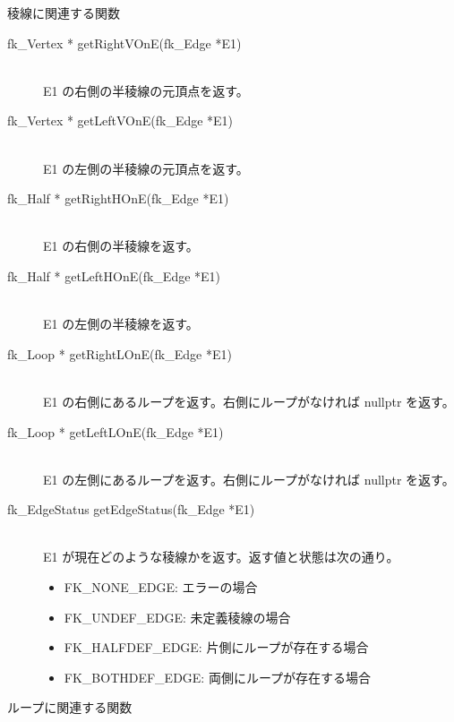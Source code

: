 \begin{center}
{\large 稜線に関連する関数}
\end{center}
\begin{description}
 \item[\hspace*{0.6cm}fk\_Vertex * getRightVOnE(fk\_Edge *E1)] ~ \\
	E1 の右側の半稜線の元頂点を返す。

 \item[\hspace*{0.6cm}fk\_Vertex * getLeftVOnE(fk\_Edge *E1)] ~ \\
	E1 の左側の半稜線の元頂点を返す。

 \item[\hspace*{0.6cm}fk\_Half * getRightHOnE(fk\_Edge *E1)] ~ \\
	E1 の右側の半稜線を返す。

 \item[\hspace*{0.6cm}fk\_Half * getLeftHOnE(fk\_Edge *E1)] ~ \\
	E1 の左側の半稜線を返す。

 \item[\hspace*{0.6cm}fk\_Loop * getRightLOnE(fk\_Edge *E1)] ~ \\
	E1 の右側にあるループを返す。右側にループがなければ
	nullptr を返す。

 \item[\hspace*{0.6cm}fk\_Loop * getLeftLOnE(fk\_Edge *E1)] ~ \\
	E1 の左側にあるループを返す。右側にループがなければ
	nullptr を返す。

 \item[\hspace*{0.6cm}fk\_EdgeStatus getEdgeStatus(fk\_Edge *E1)] ~ \\
	E1 が現在どのような稜線かを返す。返す値と状態は次の通り。
	\begin{itemize}
	 \item FK\_NONE\_EDGE: エラーの場合
	 \item FK\_UNDEF\_EDGE: 未定義稜線の場合
	 \item FK\_HALFDEF\_EDGE: 片側にループが存在する場合
	 \item FK\_BOTHDEF\_EDGE: 両側にループが存在する場合
	\end{itemize}
\end{description}
\begin{center}
{\large ループに関連する関数}
\end{center}
